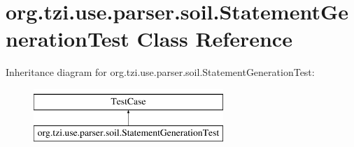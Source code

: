 \hypertarget{classorg_1_1tzi_1_1use_1_1parser_1_1soil_1_1_statement_generation_test}{\section{org.\-tzi.\-use.\-parser.\-soil.\-Statement\-Generation\-Test Class Reference}
\label{classorg_1_1tzi_1_1use_1_1parser_1_1soil_1_1_statement_generation_test}
}
Inheritance diagram for org.\-tzi.\-use.\-parser.\-soil.\-Statement\-Generation\-Test\-:\begin{figure}[H]
\begin{center}
\leavevmode
\includegraphics[height=2.000000cm]{classorg_1_1tzi_1_1use_1_1parser_1_1soil_1_1_statement_generation_test}
\end{center}
\end{figure}
